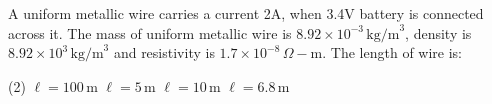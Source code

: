 
\item A uniform metallic wire carries a current 2A, when 3.4V battery is connected across it. The mass of uniform metallic wire is \(8.92 \times 10^{-3} \, \text{kg/m}^3\), density is \(8.92 \times 10^{3} \, \text{kg/m}^3\) and resistivity is \(1.7 \times 10^{-8} \, \Omega - \text{m}\). The length of wire is:
\begin{tasks}(2)
    \task \(\ell = 100 \, \text{m}\)
    \task \(\ell = 5 \, \text{m}\)
    \task \(\ell = 10 \, \text{m}\)
    \task \(\ell = 6.8 \, \text{m}\)
\end{tasks}
